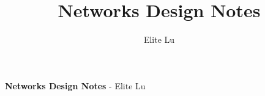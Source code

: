 \documentclass[letterpaper,8pt]{extarticle}
\date{}
\begin{document}
\pagecolor{background}
\color{body}

\raggedright
\tiny


\begin{center}
  {\textbf{Networks Design Notes} - {Elite Lu}}
\end{center}

\setlength{\tabcolsep}{2pt}
\renewcommand{\arraystretch}{1.2}

\setlength{\premulticols}{1pt}
\setlength{\postmulticols}{1pt}
\setlength{\multicolsep}{1pt}
\setlength{\columnsep}{2pt}

\title{Networks Design Notes}
\author{Elite Lu}
\end{document}

